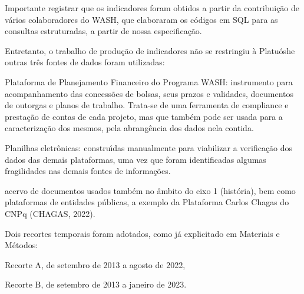 \documentclass[
12pt,		%
openright,	%
twoside,  %
a4paper,			%
chapter=TITLE,		%
english,			%
french,				%
spanish,			%
brazil				%
]{USPSC-classe/USPSC}
\begin{document}
Importante registrar que os indicadores foram obtidos a partir da contribui\c{c}\~ao de v\'arios colaboradores do WASH, que elaboraram os c\'odigos em SQL para as consultas estruturadas, a partir de nossa especifica\c{c}\~ao.










Entretanto, o trabalho de produ\c{c}\~ao de indicadores n\~ao se restringiu \`a \textquotedbl Platu\'osh\textquotedbl  e outras tr\^es fontes de dados foram utilizadas:











\begin{alineas}
\item Plataforma de Planejamento Financeiro do Programa WASH: instrumento para acompanhamento das concess\~oes de bolsas, seus prazos e validades, documentos de outorgas e planos de trabalho. Trata-se de uma ferramenta de compliance e presta\c{c}\~ao de contas de cada projeto, mas que tamb\'em pode ser usada para a caracteriza\c{c}\~ao dos mesmos, pela abrang\^encia dos dados nela contida.
\item Planilhas eletr\^onicas: constru\'{\i}das  manualmente para viabilizar a verifica\c{c}\~ao dos dados das demais plataformas, uma vez que foram identificadas algumas fragilidades nas demais fontes de informa\c{c}\~oes.
\item acervo de documentos usados tamb\'em no \^ambito do eixo 1 (hist\'oria), bem como plataformas de entidades p\'ublicas, a exemplo da Plataforma Carlos Chagas do CNPq  (CHAGAS, 2022).
\end{alineas}

Dois recortes temporais foram adotados, como j\'a explicitado em Materiais e M\'etodos:











\begin{alineas}
\item Recorte A, de setembro de 2013 a agosto de 2022,
\item Recorte B, de setembro de 2013 a janeiro de 2023.
\end{alineas}
\end{document}
